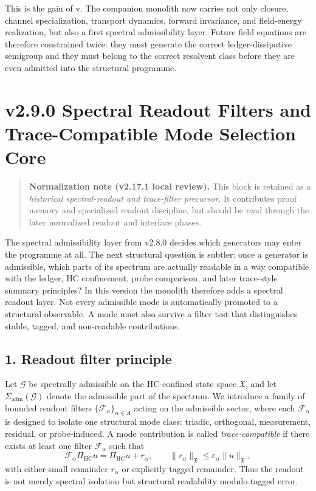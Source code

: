 This is the gain of v\docversion. The companion monolith now carries not only
closure, channel specialization, transport dynamics, forward invariance, and
field-energy realization, but also a first spectral admissibility layer. Future
field equations are therefore constrained twice: they must generate the correct
ledger-dissipative semigroup and they must belong to the correct resolvent class
before they are even admitted into the structural programme.


\section*{v2.9.0 Spectral Readout Filters and Trace-Compatible Mode Selection Core}

\begin{quote}
\textbf{Normalization note (v2.17.1 local review).}
This block is retained as a \emph{historical spectral-readout and trace-filter precursor}. It contributes proof memory and specialized readout discipline, but should be read through the later normalized readout and interface phases.
\end{quote}

The spectral admissibility layer from v2.8.0 decides which generators may enter the
programme at all. The next structural question is subtler: once a generator is
admissible, which parts of its spectrum are actually readable in a way compatible
with the ledger, HC confinement, probe comparison, and later trace-style summary
principles? In this version the monolith therefore adds a spectral readout layer.
Not every admissible mode is automatically promoted to a structural observable. A
mode must also survive a filter test that distinguishes stable, tagged, and
non-readable contributions.

\subsection*{1. Readout filter principle}
Let $\mathcal G$ be spectrally admissible on the HC-confined state space
$\mathfrak X$, and let $\Sigma_{\mathrm{adm}}(\mathcal G)$ denote the admissible part
of the spectrum. We introduce a family of bounded readout filters
$\{\mathcal F_\alpha\}_{\alpha\in A}$ acting on the admissible sector, where each
$\mathcal F_\alpha$ is designed to isolate one structural mode class: triadic,
orthogonal, measurement, residual, or probe-induced. A mode contribution is called
\emph{trace-compatible} if there exists at least one filter $\mathcal F_\alpha$ such
that
\[
\mathcal F_\alpha \Pi_{\mathrm{HC}} u = \Pi_{\mathrm{HC}} u + r_\alpha,
\qquad
\|r_\alpha\|_{\mathfrak X} \le \varepsilon_\alpha \|u\|_{\mathfrak X},
\]
with either small remainder $r_\alpha$ or explicitly tagged remainder. Thus the
readout is not merely spectral isolation but structural readability modulo tagged
error.

